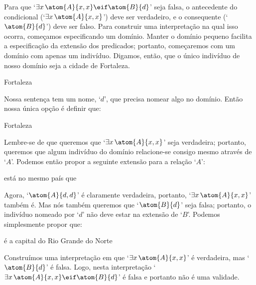 Para que `$\exists x\,\atom{A}{x,x} \eif \atom{B}{d}$' seja falsa, o antecedente do condicional (`$\exists x\, \atom{A}{x,x}$') deve ser verdadeiro, e o consequente (`$\atom{B}{d}$') deve ser falso.
Para construir uma interpretação na qual isso ocorra, começamos especificando um domínio.
Manter o domínio pequeno facilita a especificação da extensão dos predicados; portanto, começaremos com um domínio com apenas um indivíduo.
Digamos, então, que o único indivíduo de nosso domínio seja a cidade de Fortaleza.
\begin{center}
	\begin{ekey}
		\item[\text{domínio}] Fortaleza
	\end{ekey}
\end{center}
Nossa sentença tem um nome, `$d$', que precisa nomear algo no domínio.
Então nossa única opção é definir que:
\begin{center}
	\begin{ekey}
		\item[d] Fortaleza
	\end{ekey}
\end{center}
Lembre-se de que queremos que `$\exists x\, \atom{A}{x,x}$' seja verdadeira; portanto, queremos que algum indivíduo do domínio relacione-se consigo mesmo através de `$A$'.
Podemos então propor a seguinte extensão para a relação `$A$':
\begin{center}
	\begin{ekey}
		\item[\atom{A}{x,y}]  está no mesmo país que 
	\end{ekey}
\end{center}
Agora, `$\atom{A}{d,d}$' é claramente verdadeira, portanto, `$\exists x\, \atom{A}{x,x}$' também é. 
Mas nós também queremos que `$\atom{B}{d}$' seja falsa; portanto, o indivíduo nomeado por `$d$' não deve estar na extensão de `$B$'.
Podemos simplesmente propor que:
\begin{center}
	\begin{ekey}
		\item[\atom{B}{x}]  é a capital do Rio Grande do Norte
	\end{ekey}
\end{center}
Construímos uma interpretação em que `$\exists x\, \atom{A}{x,x}$' é verdadeira, mas `$\atom{B}{d}$' é falsa.
Logo, nesta interpretação `$\exists x\, \atom{A}{x,x} \eif \atom{B}{d}$' é falsa e portanto não é uma validade.

